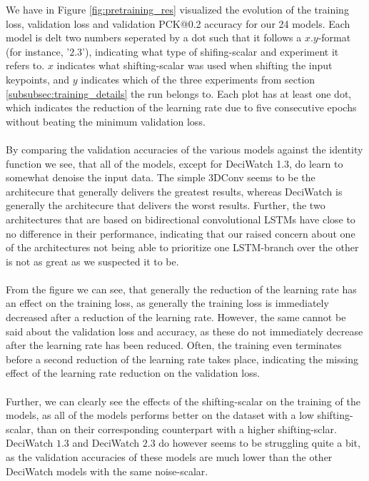 \documentclass[./main.tex]{subfiles}
\begin{document}
We have in Figure \ref{fig:pretraining_res} visualized the evolution of the training loss, validation loss and validation PCK@0.2 accuracy for our 24 models. Each model is delt two numbers seperated by a dot such that it follows a $x.y$-format (for instance, '$2.3$'), indicating what type of shifing-scalar and experiment it refers to. $x$ indicates what shifting-scalar was used when shifting the input keypoints, and $y$ indicates which of the three experiments from section \ref{subsubsec:training_details} the run belongs to. Each plot has at least one dot, which indicates the reduction of the learning rate due to five consecutive epochs without beating the minimum validation loss.
\\
\\
By comparing the validation accuracies of the various models against the identity function we see, that all of the models, except for DeciWatch 1.3, do learn to somewhat denoise the input data. The simple 3DConv seems to be the architecure that generally delivers the greatest results, whereas DeciWatch is generally the architecure that delivers the worst results. Further, the two architectures that are based on bidirectional convolutional LSTMs have close to no difference in their performance, indicating that our raised concern about one of the architectures not being able to prioritize one LSTM-branch over the other is not as great as we suspected it to be.
\\
\\
From the figure we can see, that generally the reduction of the learning rate has an effect on the training loss, as generally the training loss is immediately decreased after a reduction of the learning rate. However, the same cannot be said about the validation loss and accuracy, as these do not immediately decrease after the learning rate has been reduced. Often, the training even terminates before a second reduction of the learning rate takes place, indicating the missing effect of the learning rate reduction on the validation loss.
\\
\\
Further, we can clearly see the effects of the shifting-scalar on the training of the models, as all of the models performs better on the dataset with a low shifting-scalar, than on their corresponding counterpart with a higher shifting-sclar. DeciWatch $1.3$ and DeciWatch $2.3$ do however seems to be struggling quite a bit, as the validation accuracies of these models are much lower than the other DeciWatch models with the same noise-scalar.
\end{document}
